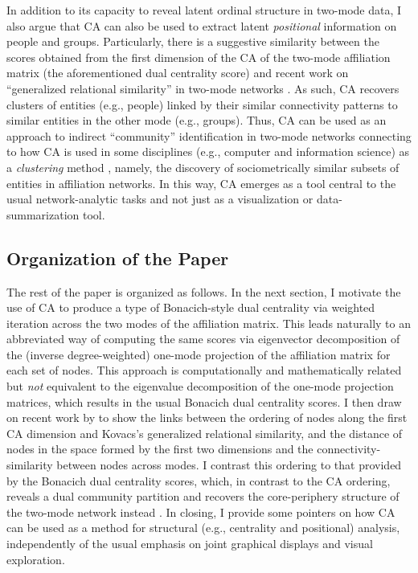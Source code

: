 \documentclass[a4paper,fleqn]{cas-sc}
\begin{document}
In addition to its capacity to reveal latent ordinal structure in two-mode data, I also argue that CA can also be used to extract latent \textit{positional} information on people and groups. Particularly, there is a suggestive similarity between the scores obtained from the first dimension of the CA of the two-mode affiliation matrix (the aforementioned dual centrality score) and recent work on ``generalized relational similarity'' in two-mode networks \citep{kovacs2010generalized, lizardo2024two}. As such, CA recovers clusters of entities (e.g., people) linked by their similar connectivity patterns to similar entities in the other mode (e.g., groups). Thus, CA can be used as an approach to indirect ``community'' identification in two-mode networks connecting to how CA is used in some disciplines (e.g., computer and information science) as a \textit{clustering} method \citep{zha2001bipartite}, namely, the discovery of sociometrically similar subsets of entities in affiliation networks. In this way, CA emerges as a tool central to the usual network-analytic tasks and not just as a visualization or data-summarization tool.

\subsection{Organization of the Paper} \label{subsec:org}
The rest of the paper is organized as follows. In the next section, I motivate the use of CA to produce a type of Bonacich-style dual centrality via weighted iteration across the two modes of the affiliation matrix. This leads naturally to an abbreviated way of computing the same scores via eigenvector decomposition of the (inverse degree-weighted) one-mode projection of the affiliation matrix for each set of nodes. This approach is computationally and mathematically related but \textit{not} equivalent to the eigenvalue decomposition of the one-mode projection matrices, which results in the usual Bonacich dual centrality scores. I then draw on recent work by \citet{van2021correspondence} to show the links between the ordering of nodes along the first CA dimension and Kovacs's generalized relational similarity, and the distance of nodes in the space formed by the first two dimensions and the connectivity-similarity between nodes across modes. I contrast this ordering to that provided by the Bonacich dual centrality scores, which, in contrast to the CA ordering, reveals a dual community partition and recovers the core-periphery structure of the two-mode network instead \citep{everett2013dual}. In closing, I provide some pointers on how CA can be used as a method for structural (e.g., centrality and positional) analysis, independently of the usual emphasis on joint graphical displays and visual exploration. 
\end{document}
